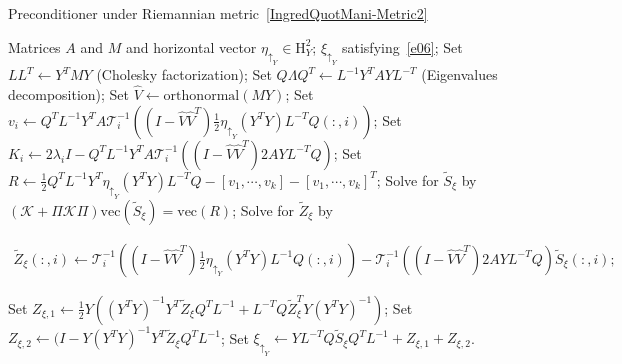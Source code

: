 \documentclass[11pt]{article}
\numberwithin{equation}{section}
\begin{document}
\begin{algorithm}[htbp]
  \caption{Preconditioner under Riemannian metric~\eqref{IngredQuotMani-Metric2}} 
  \begin{algorithmic}[1] \label{Precond-Metric2-Alg}
  \REQUIRE Matrices $A$ and $M$ and horizontal vector $\eta_{\uparrow_Y}\in\mathrm{H}_Y^2$;
  \ENSURE $\xi_{\uparrow_Y}$ satisfying~\eqref{e06};
  \STATE Set $LL^T\gets Y^TMY$ (Cholesky factorization);
  \STATE Set $Q\Lambda Q^T\gets L^{-1}Y^TAYL^{-T}$ (Eigenvalues decomposition); 
  \STATE Set $\hat{V}\gets \mathrm{orthonormal}(MY)$;
  \STATE Set $v_i\gets Q^TL^{-1}Y^TA\mathcal{T}_i^{-1}\left( (I-\hat{V}\hat{V}^T)\frac{1}{2}\eta_{\uparrow_Y}(Y^TY)L^{-T}Q(:,i)\right)$;
  \STATE Set $K_i\gets 2\lambda_iI-Q^TL^{-1}Y^TA\mathcal{T}_i^{-1}\left( (I-\hat{V}\hat{V}^T)2AYL^{-T}Q\right)$;
  \STATE Set $R\gets \frac{1}{2}Q^TL^{-1}Y^T\eta_{\uparrow_Y}(Y^TY)L^{-T}Q-[v_1,\cdots,v_k]-[v_1,\cdots,v_k]^T$;
  \STATE Solve for $\tilde{S}_\xi$ by $(\mathcal{K}+\Pi\mathcal{K}\Pi)\mathrm{vec}(\tilde{S}_\xi)=\mathrm{vec}(R)$;
  \STATE Solve for $\tilde{Z}_\xi$ by   
    \begin{small}
    \begin{align}  \nonumber
  	 \tilde{Z}_\xi (:, i)\gets \mathcal{T}_i^{-1}\left((I-\hat{V}\hat{V}^T)\frac{1}{2}\eta_{\uparrow_Y}(Y^TY)L^{-1}Q(:,i)\right) - \mathcal{T}_i^{-1}\left((I-\hat{V}\hat{V}^T)2AYL^{-T}Q\right)\tilde{S}_\xi(:,i);
    \end{align}
  	\end{small}  
  \STATE Set $Z_{\xi,1}\gets \frac{1}{2}Y\left( (Y^TY)^{-1}Y^T\tilde{Z}_\xi Q^TL^{-1} + L^{-T}Q\tilde{Z}_{\xi}^TY(Y^TY)^{-1}  \right)$;
  \STATE Set $Z_{\xi,2}\gets (I - Y(Y^TY)^{-1}Y^T\tilde{Z}_{\xi}Q^TL^{-1}$;
  \STATE Set $\xi_{\uparrow_Y}\gets YL^{-T}Q\tilde{S}_\xi Q^TL^{-1} + Z_{\xi,1} + Z_{\xi,2}$.
  
 \end{algorithmic}
\end{algorithm}
%
%
%
\end{document}
